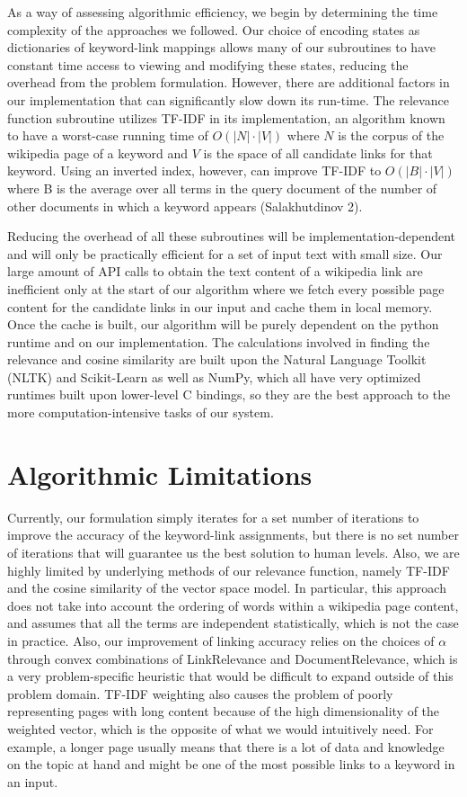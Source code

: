 \documentclass[twoside,11pt]{article}
\begin{document}
As a way of assessing algorithmic efficiency, we begin by determining the time complexity of the approaches we followed. Our  choice of encoding states as dictionaries of keyword-link mappings allows many of our subroutines to have constant time access to viewing and modifying these states, reducing the overhead from the problem formulation. However, there are additional factors in our implementation that can significantly slow down its run-time. The relevance function subroutine utilizes TF-IDF in its implementation, an algorithm known to have a worst-case running time of $O(|N|\cdot|V|)$ where $N$ is the corpus of the wikipedia page of a keyword and $V$ is the space of all candidate links for that keyword. Using an inverted index, however, can improve TF-IDF to $O(|B|\cdot|V|)$ where B is the average over all terms in the query document of the number of other documents in which a keyword appears (Salakhutdinov 2).

Reducing the overhead of all these subroutines will be implementation-dependent and will only be practically efficient for a set of input text with small size. Our large amount of API calls to obtain the text content of a wikipedia link are inefficient only at the start of our algorithm where we fetch every possible page content for the candidate links in our input and cache them in local memory. Once the cache is built, our algorithm will be purely dependent on the python runtime and on our implementation. The calculations involved in finding the relevance and cosine similarity are built upon the Natural Language Toolkit (NLTK) and Scikit-Learn as well as NumPy, which all have very optimized runtimes built upon lower-level C bindings, so they are the best approach to the more computation-intensive tasks of our system.

\section{Algorithmic Limitations}

Currently, our formulation simply iterates for a set number of iterations to improve the accuracy of the keyword-link assignments, but there is no set number of iterations that will guarantee us the best solution to human levels. Also, we are highly limited by underlying methods of our relevance function, namely TF-IDF and the cosine similarity of the vector space model. In particular, this approach does not take into account the ordering of words within a wikipedia page content, and assumes that all the terms are independent statistically, which is not the case in practice. Also, our improvement of linking accuracy relies on the choices of $\alpha$ through convex combinations of {\sc LinkRelevance} and {\sc DocumentRelevance}, which is a very problem-specific heuristic that would be difficult to expand outside of this problem domain. TF-IDF weighting also causes the problem of poorly representing pages with long content because of the high dimensionality of the weighted vector, which is the opposite of what we would intuitively need. For example, a longer page usually means that there is a lot of data and knowledge on the topic at hand and might be one of the most possible links to a keyword in an input.
\end{document}
